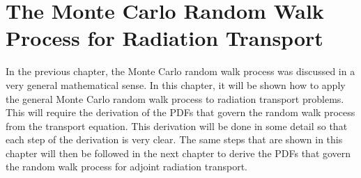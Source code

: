 \chapter{The Monte Carlo Random Walk Process for Radiation Transport}
\label{ch:particle_transport}
In the previous chapter, the Monte Carlo random walk process was discussed in a 
very general mathematical sense. In this chapter, it will be shown how to apply
the general Monte Carlo random walk process to radiation transport 
problems. This will require the derivation of the PDFs that govern the random 
walk process from the transport equation. This derivation will be done in
some detail so that each step of the derivation is very clear. The same steps
that are shown in this chapter will then be followed in the next chapter
to derive the PDFs that govern the random walk process for adjoint radiation
transport. 

